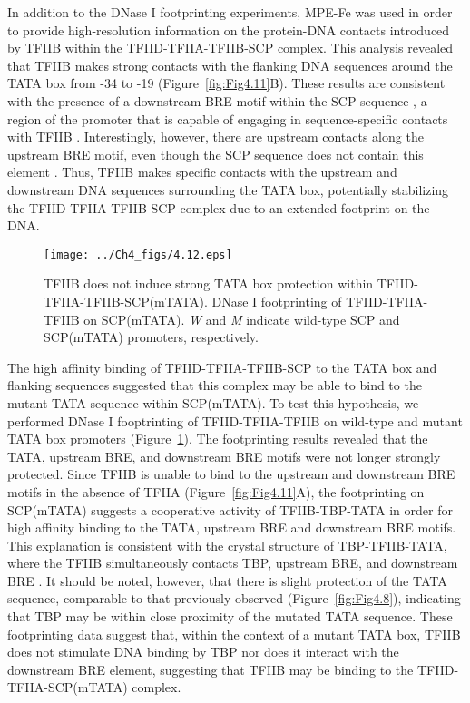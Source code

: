 \indent In addition to the DNase I footprinting experiments, MPE-Fe was used in order to provide high-resolution information on the protein-DNA contacts introduced by TFIIB within the TFIID-TFIIA-TFIIB-SCP complex. This analysis revealed that TFIIB makes strong contacts with the flanking DNA sequences around the TATA box from -34 to -19 (Figure~\ref{fig:Fig4.11}B). These results are consistent with the presence of a downstream BRE motif within the SCP sequence \cite{Juven-Gershon_1249}, a region of the promoter that is capable of engaging in sequence-specific contacts with TFIIB \cite{Deng_2005,Tsai_2000}. Interestingly, however, there are upstream contacts along the upstream BRE motif, even though the SCP sequence does not contain this element \cite{Juven-Gershon_1249}. Thus, TFIIB makes specific contacts with the upstream and downstream DNA sequences surrounding the TATA box, potentially stabilizing the TFIID-TFIIA-TFIIB-SCP complex due to an extended footprint on the DNA. \\
\begin{figure}
\centering
\texttt{[image: ../Ch4\_figs/4.12.eps]}
\caption[TFIIB does not induce strong TATA box protection within TFIID-TFIIA-TFIIB-SCP(mTATA)]{TFIIB does not induce strong TATA box protection within TFIID-TFIIA-TFIIB-SCP(mTATA). DNase I footprinting of TFIID-TFIIA-TFIIB on SCP(mTATA). \emph{W} and \emph{M} indicate wild-type SCP and SCP(mTATA) promoters, respectively. }
\label{fig:Fig4.12}
\end{figure}
\indent The high affinity binding of TFIID-TFIIA-TFIIB-SCP to the TATA box and flanking sequences suggested that this complex may be able to bind to the mutant TATA sequence within SCP(mTATA). To test this hypothesis, we performed DNase I fooptrinting of TFIID-TFIIA-TFIIB on wild-type and mutant TATA box promoters (Figure~\ref{fig:Fig4.12}). The footprinting results revealed that the TATA, upstream BRE, and downstream BRE motifs were not longer strongly protected. Since TFIIB is unable to bind to the upstream and downstream BRE motifs in the absence of TFIIA (Figure~\ref{fig:Fig4.11}A), the footprinting on SCP(mTATA) suggests a cooperative activity of TFIIB-TBP-TATA in order for high affinity binding to the TATA, upstream BRE and downstream BRE motifs. This explanation is consistent with the crystal structure of TBP-TFIIB-TATA, where the TFIIB simultaneously contacts TBP, upstream BRE, and downstream BRE \cite{Tsai_2000}. It should be noted, however, that there is slight protection of the TATA sequence, comparable to that previously observed (Figure~\ref{fig:Fig4.8}), indicating that TBP may be within close proximity of the mutated TATA sequence. These footprinting data suggest that, within the context of a mutant TATA box, TFIIB does not stimulate DNA binding by TBP nor does it interact with the downstream BRE element, suggesting that TFIIB may be binding to the TFIID-TFIIA-SCP(mTATA) complex.\\
